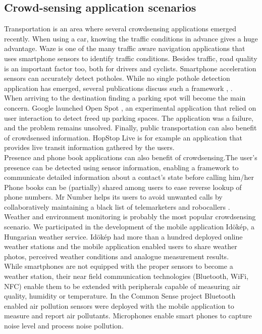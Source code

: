 \documentclass[conference,letterpaper]{IEEEtran}
\begin{document}
\subsection{Crowd-sensing application scenarios}
Transportation is an area where several crowdsensing applications emerged recently. When using a car, knowing the traffic conditions in advance gives a huge advantage. Waze \cite{Waze} is one of the many traffic aware navigation applications that uses smartphone sensors to identify traffic conditions. Besides traffic, road quality is an important factor too, both for drivers and cyclists. Smartphone acceleration sensors can accurately detect potholes. While no single pothole detection application has emerged, several publications discuss such a framework \cite{Mednis2011}, \cite{Eriksson2008}.\\
\indent When arriving to the destination finding a parking spot will become the main concern. Google launched Open Spot \cite{OpenSpot}, an experimental application that relied on user interaction to detect freed up parking spaces. The application was a failure, and the problem remains unsolved. Finally, public transportation can also benefit of crowdsensed information. HopStop Live \cite{HopStop} is for example an application that provides live transit information gathered by the users.\\
\indent Presence and phone book applications can also benefit of crowdsensing.The user's presence can be detected using sensor information, enabling a framework to communicate detailed information about a contact's state before calling him/her \cite{Miluzzo2008} Phone books can be (partially) shared among users to ease reverse lookup of phone numbers. Mr Number helps its users to avoid unwanted calls by collaboratively maintaining a black list of telemarketers and robocallers \cite{MrNumber}.\\
\indent Weather and environment monitoring is probably the most popular crowdsensing scenario. We participated in the development of the mobile application  Id\"ok\'ep, a Hungarian weather service. Id\"ok\'ep had more than a hundred deployed online weather stations and the mobile application enabled users to share weather photos, perceived weather conditions and analogue measurement results.\\
\indent While smartphones are not equipped with the proper sensors to become a weather station, their near field communication technologies (Bluetooth, WiFi, NFC) enable them to be extended with peripherals capable of measuring air quality, humidity or temperature. In the Common Sense project Bluetooth enabled air pollution sensors were deployed with the mobile application to measure and report air pollutants. Microphones enable smart phones to capture noise level and process noise pollution.\\
\end{document}
